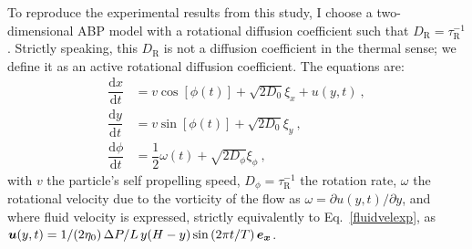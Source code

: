 To reproduce the experimental results from this study, I choose a two-dimensional ABP model with a rotational diffusion coefficient such that $D_\mathrm{R} = \tau_\mathrm{R}^{-1}$. Strictly speaking, this $D_\mathrm{R}$ is not a diffusion coefficient in the thermal sense; we  define it as an active rotational diffusion coefficient. The equations are:
\begin{align}
    \dfrac{\mathrm{d}x}{\mathrm{d}t} & = v \cos [\phi(t)] + \sqrt{2D_0} \xi_x + u(y, t)~, \\ 
    \dfrac{\mathrm{d}y}{\mathrm{d}t} & = v \sin [\phi(t)] + \sqrt{2D_0} \xi_y~, \\
    \dfrac{\mathrm{d}\phi}{\mathrm{d}t} & = \dfrac{1}{2} \omega(t) + \sqrt{2D_\phi} \xi_\phi~,
    \label{equationsnum}
\end{align}
with $v$ the particle's self propelling speed, $D_\phi = \tau_\mathrm{R}^{-1}$ the rotation rate, $\omega$ the rotational velocity due to the vorticity of the flow as $\omega = \partial{u(y, t)}/\partial{y}$, and where fluid velocity is expressed, strictly equivalently to Eq.~\ref{fluidvelexp}, as $\bm{u}(y, t) = 1/(2 \eta_0) \, \Delta P/L \, y(H - y) \sin \left(2 \pi t/T\right) \bm{e_x}$.

